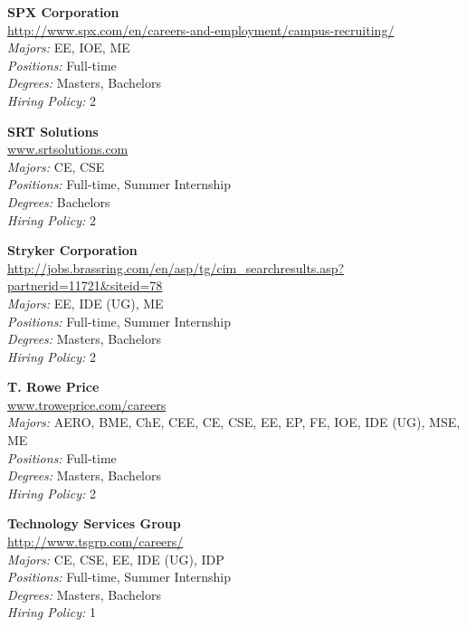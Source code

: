 \documentclass[twoside]{article}
\begin{document}
\begin{center}
\begin{multicols}{3}
\begin{minipage}{.9\columnwidth}{\Large\bf SPX Corporation }\\
	\url{http://www.spx.com/en/careers-and-employment/campus-recruiting/}\\
	\emph{Majors:} EE, IOE, ME\\
	\emph{Positions:} Full-time\\
	\emph{Degrees:} Masters, Bachelors\\
	\emph{Hiring Policy:} 2\\
\end{minipage}
 
\begin{minipage}{.9\columnwidth}{\Large\bf SRT Solutions }\\
	\url{www.srtsolutions.com}\\
	\emph{Majors:} CE, CSE\\
	\emph{Positions:} Full-time, Summer Internship\\
	\emph{Degrees:} Bachelors\\
	\emph{Hiring Policy:} 2\\
\end{minipage}
 
\begin{minipage}{.9\columnwidth}{\Large\bf Stryker Corporation }\\
	\url{http://jobs.brassring.com/en/asp/tg/cim_searchresults.asp?partnerid=11721&siteid=78}\\
	\emph{Majors:} EE, IDE (UG), ME\\
	\emph{Positions:} Full-time, Summer Internship\\
	\emph{Degrees:} Masters, Bachelors\\
	\emph{Hiring Policy:} 2\\
\end{minipage}
 
\begin{minipage}{.9\columnwidth}{\Large\bf T. Rowe Price }\\
	\url{www.troweprice.com/careers}\\
	\emph{Majors:} AERO, BME, ChE, CEE, CE, CSE, EE, EP, FE, IOE, IDE (UG), MSE, ME\\
	\emph{Positions:} Full-time\\
	\emph{Degrees:} Masters, Bachelors\\
	\emph{Hiring Policy:} 2\\
\end{minipage}
 
\begin{minipage}{.9\columnwidth}{\Large\bf Technology Services Group }\\
	\url{http://www.tsgrp.com/careers/}\\
	\emph{Majors:} CE, CSE, EE, IDE (UG), IDP\\
	\emph{Positions:} Full-time, Summer Internship\\
	\emph{Degrees:} Masters, Bachelors\\
	\emph{Hiring Policy:} 1\\
\end{minipage}
 

\end{multicols}
\end{center}
\end{document}
